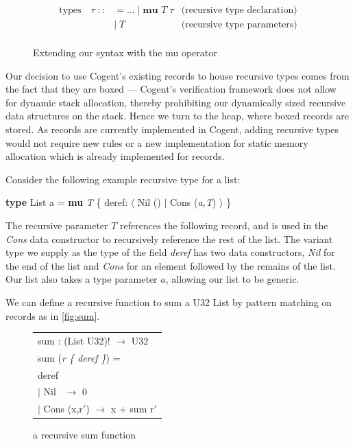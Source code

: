 \FloatBarrier

\begin{figure}
    \centering
    \begin{align*}
        \text{types}\quad \tau\;
            ::&= \dots\; |\; \textbf{mu } T\; \tau & \text{(recursive type declaration)} \\
              &|\; T & \text{(recursive type parameters)} \\
    \end{align*}
    \caption{Extending our syntax with the mu operator}
    \label{fig:mu}
\end{figure}

Our decision to use Cogent's existing records to house recursive types comes from the fact that they are boxed ---
Cogent's verification framework does not allow for dynamic stack allocation, thereby prohibiting
our dynamically sized recursive data structures on the stack. Hence we turn to the heap,
where boxed records are stored. As records are currently implemented in Cogent, adding recursive
types would not require new rules or a new implementation for static memory allocation which
is already implemented for records. 

Consider the following example recursive type for a list:
\begin{center}
    \textbf{type} List a = \textbf{mu} \textit{T} \{ deref: $\langle$ Nil () $\vert$ Cons (\textit{a,T}) $\rangle$ \}
\end{center}

The recursive parameter $T$ references the following record, and is used in the \textit{Cons} data constructor
to recursively reference the rest of the list.
The variant type  we supply as the type of the field
\textit{deref} has two data constructors, \textit{Nil} for the end of the list and \textit{Cons} for an element
followed by the remains of the list. Our list also takes a type parameter $a$, allowing our list to be generic.

We can define a recursive function to sum a U32 List by pattern matching on records as 
in \autoref{fig:sum}.

\begin{figure}%
    \begin{center}
        \begin{tabular}{l}
            sum : (List U32)! $\rightarrow$ U32 \\
            sum (\textit{r \{ deref \}}) = \\
            \hspace{0.8em} deref \\
                \hspace{2em} $\vert$ Nil  \quad\quad\quad$\,$   $\rightarrow$ 0 \\
                \hspace{2em} $\vert$ Cons (x,r$'$)  $\rightarrow$ x + sum r$'$
        \end{tabular}
    \end{center}
    \caption[short]{a recursive sum function}
    \label{fig:sum}
\end{figure}

